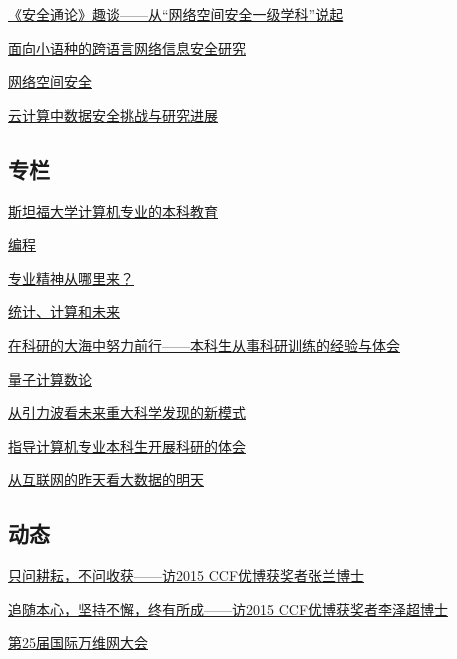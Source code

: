 \documentclass[a4paper]{article}
\begin{document}
\href{http://history.ccf.org.cn/resources/1190201776262/2016/05/12/2.pdf}{《安全通论》趣谈——从“网络空间安全一级学科”说起}

\href{http://history.ccf.org.cn/resources/1190201776262/2016/05/12/6.pdf}{面向小语种的跨语言网络信息安全研究}

\href{http://history.ccf.org.cn/resources/1190201776262/2016/05/12/1.pdf}{网络空间安全}

\href{http://history.ccf.org.cn/resources/1190201776262/2016/05/12/4.pdf}{云计算中数据安全挑战与研究进展}

\subsection{专栏}
\href{http://history.ccf.org.cn/resources/1190201776262/2016/05/12/10.pdf}{斯坦福大学计算机专业的本科教育}

\href{http://history.ccf.org.cn/resources/1190201776262/2016/05/12/15.pdf}{编程}

\href{http://history.ccf.org.cn/resources/1190201776262/2016/05/12/11.pdf}{专业精神从哪里来？}

\href{http://history.ccf.org.cn/resources/1190201776262/2016/05/12/8.pdf}{统计、计算和未来}

\href{http://history.ccf.org.cn/resources/1190201776262/2016/05/12/13.pdf}{在科研的大海中努力前行——本科生从事科研训练的经验与体会}

\href{http://history.ccf.org.cn/resources/1190201776262/2016/05/12/7.pdf}{量子计算数论}

\href{http://history.ccf.org.cn/resources/1190201776262/2016/05/12/9.pdf}{从引力波看未来重大科学发现的新模式}

\href{http://history.ccf.org.cn/resources/1190201776262/2016/05/12/12.pdf}{指导计算机专业本科生开展科研的体会}

\href{http://history.ccf.org.cn/resources/1190201776262/2016/05/12/14.pdf}{从互联网的昨天看大数据的明天}

\subsection{动态}
\href{http://history.ccf.org.cn/resources/1190201776262/2016/05/12/16.pdf}{只问耕耘，不问收获——访2015 CCF优博获奖者张兰博士}

\href{http://history.ccf.org.cn/resources/1190201776262/2016/05/12/17.pdf}{追随本心，坚持不懈，终有所成——访2015 CCF优博获奖者李泽超博士}

\href{http://history.ccf.org.cn/resources/1190201776262/2016/05/12/18.pdf}{第25届国际万维网大会}
\end{document}
